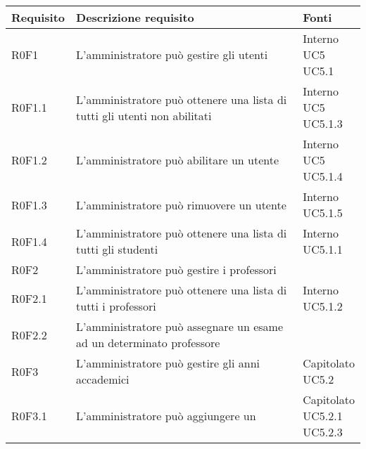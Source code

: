 \documentclass[AnalisiDeiRequisiti.tex]{subfiles}
\begin{document}
\label{table:Tabella di tracciamento requisiti-fonti}
\renewcommand*{\arraystretch}{1.2}
\begin{longtable}[H]{p{2cm}p{5.2cm}p{5cm}}
	\rowcolor{CHeader} 
	\color{CHeaderText} \textbf{Requisito} & \color{CHeaderText} \textbf{Descrizione requisito} & \color{CHeaderText} \textbf{Fonti} \\  
	\endhead
	R0F1 &  L'amministratore può gestire gli utenti & \makecell[tl]{
		Interno \\
		UC5 \\
		UC5.1
	} \\  
	R0F1.1 &  L'amministratore può ottenere una lista di tutti gli utenti non abilitati & \makecell[tl]{
		Interno \\ 
		UC5 \\  
		UC5.1.3
	} \\  
	R0F1.2 &  L'amministratore può abilitare un utente & \makecell[tl]{
		Interno \\ 
		UC5 \\ 
		UC5.1.4
	} \\  
	R0F1.3 &  L'amministratore può rimuovere un utente & \makecell[tl]{
		Interno \\ 
		UC5.1.5
	} \\  
	R0F1.4 &  L'amministratore può ottenere una lista di tutti gli studenti & \makecell[tl]{
		Interno \\  
		UC5.1.1
	} \\  
	R0F2 &  L'amministratore può gestire i professori & \makecell[tl]{
		Interno
	} \\  
	R0F2.1 &  L'amministratore può ottenere una lista di tutti i professori & \makecell[tl]{
		Interno \\ 
		UC5.1.2 
	} \\  
	R0F2.2 &  L'amministratore può assegnare un esame ad un determinato professore & \makecell[tl]{
		Capitolato
	} \\  
	R0F3 &  L'amministratore può gestire gli anni accademici & \makecell[tl]{
		Capitolato \\ 
		UC5.2
	} \\  
	R0F3.1 &  L'amministratore può aggiungere un \citGloss{anno accademico} & \makecell[tl]{
		Capitolato \\ 
		UC5.2.1 \\ 
		UC5.2.3 \\ 
}
\end{longtable}
\end{document}
